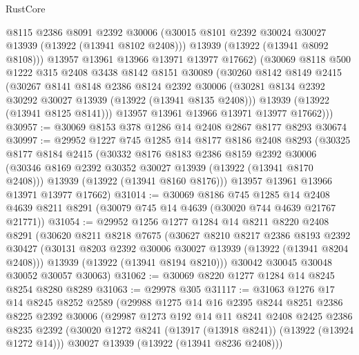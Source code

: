 \begin{lexlean}{RustCore}
\begin{coremodule}
          @8115
          @2386
          @8091
          @2392
          @30006
          (@30015 @8101 @2392 @30024 @30027 @13939 (@13922 (@13941 @8102 @2408)))
          @13939
          (@13922 (@13941 @8092 @8108)))
        @13957
        @13961
        @13966
        @13971
        @13977
        @17662)
      (@30069
        @8118
        @500
        @1222
        @315
        @2408
        @3438
        @8142
        @8151
        @30089
        (@30260
          @8142
          @8149
          @2415
          (@30267
            @8141
            @8148
            @2386
            @8124
            @2392
            @30006
            (@30281 @8134 @2392 @30292 @30027 @13939 (@13922 (@13941 @8135 @2408)))
            @13939
            (@13922 (@13941 @8125 @8141)))
          @13957
          @13961
          @13966
          @13971
          @13977
          @17662)))
@30957 := @30069 @8153 @378 @1286 @14 @2408 @2867 @8177 @8293 @30674
@30997 := @29952
    @1227
    @745
    @1285
    @14
    @8177
    @8186
    @2408
    @8293
    (@30325
      @8177
      @8184
      @2415
      (@30332
        @8176
        @8183
        @2386
        @8159
        @2392
        @30006
        (@30346 @8169 @2392 @30352 @30027 @13939 (@13922 (@13941 @8170 @2408)))
        @13939
        (@13922 (@13941 @8160 @8176)))
      @13957
      @13961
      @13966
      @13971
      @13977
      @17662)
@31014 := @30069
    @8186
    @745
    @1285
    @14
    @2408
    @4639
    @8211
    @8291
    (@30079 @745 @14 @4639 (@30020 @744 @4639 @21767 @21771))
@31054 := @29952
    @1256
    @1277
    @1284
    @14
    @8211
    @8220
    @2408
    @8291
    (@30620
      @8211
      @8218
      @7675
      (@30627
        @8210
        @8217
        @2386
        @8193
        @2392
        @30427
        (@30131 @8203 @2392 @30006 @30027 @13939 (@13922 (@13941 @8204 @2408)))
        @13939
        (@13922 (@13941 @8194 @8210)))
      @30042
      @30045
      @30048
      @30052
      @30057
      @30063)
@31062 := @30069 @8220 @1277 @1284 @14 @8245 @8254 @8280 @8289
@31063 := @29978 @305
@31117 := @31063
    @1276
    @17
    @14
    @8245
    @8252
    @2589
    (@29988
      @1275
      @14
      @16
      @2395
      @8244
      @8251
      @2386
      @8225
      @2392
      @30006
      (@29987
        @1273
        @192
        @14
        @11
        @8241
        @2408
        @2425
        @2386
        @8235
        @2392
        (@30020 @1272 @8241 (@13917 (@13918 @8241)) (@13922 (@13924 @1272 @14)))
        @30027
        @13939
        (@13922 (@13941 @8236 @2408)))

\end{coremodule}
\end{lexlean}
